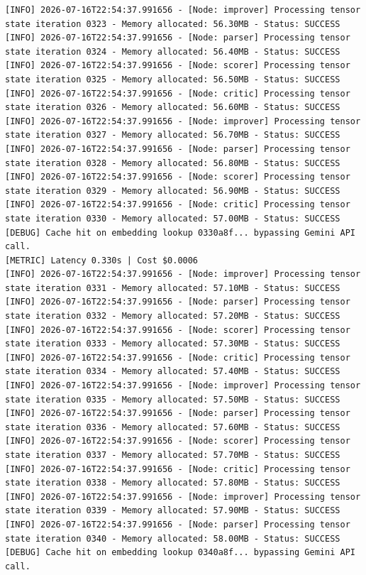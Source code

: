 \documentclass[10pt,journal,compsoc]{IEEEtran}
\begin{document}
\begin{verbatim}
[INFO] 2026-07-16T22:54:37.991656 - [Node: improver] Processing tensor state iteration 0323 - Memory allocated: 56.30MB - Status: SUCCESS
[INFO] 2026-07-16T22:54:37.991656 - [Node: parser] Processing tensor state iteration 0324 - Memory allocated: 56.40MB - Status: SUCCESS
[INFO] 2026-07-16T22:54:37.991656 - [Node: scorer] Processing tensor state iteration 0325 - Memory allocated: 56.50MB - Status: SUCCESS
[INFO] 2026-07-16T22:54:37.991656 - [Node: critic] Processing tensor state iteration 0326 - Memory allocated: 56.60MB - Status: SUCCESS
[INFO] 2026-07-16T22:54:37.991656 - [Node: improver] Processing tensor state iteration 0327 - Memory allocated: 56.70MB - Status: SUCCESS
[INFO] 2026-07-16T22:54:37.991656 - [Node: parser] Processing tensor state iteration 0328 - Memory allocated: 56.80MB - Status: SUCCESS
[INFO] 2026-07-16T22:54:37.991656 - [Node: scorer] Processing tensor state iteration 0329 - Memory allocated: 56.90MB - Status: SUCCESS
[INFO] 2026-07-16T22:54:37.991656 - [Node: critic] Processing tensor state iteration 0330 - Memory allocated: 57.00MB - Status: SUCCESS
[DEBUG] Cache hit on embedding lookup 0330a8f... bypassing Gemini API call.
[METRIC] Latency 0.330s | Cost $0.0006
[INFO] 2026-07-16T22:54:37.991656 - [Node: improver] Processing tensor state iteration 0331 - Memory allocated: 57.10MB - Status: SUCCESS
[INFO] 2026-07-16T22:54:37.991656 - [Node: parser] Processing tensor state iteration 0332 - Memory allocated: 57.20MB - Status: SUCCESS
[INFO] 2026-07-16T22:54:37.991656 - [Node: scorer] Processing tensor state iteration 0333 - Memory allocated: 57.30MB - Status: SUCCESS
[INFO] 2026-07-16T22:54:37.991656 - [Node: critic] Processing tensor state iteration 0334 - Memory allocated: 57.40MB - Status: SUCCESS
[INFO] 2026-07-16T22:54:37.991656 - [Node: improver] Processing tensor state iteration 0335 - Memory allocated: 57.50MB - Status: SUCCESS
[INFO] 2026-07-16T22:54:37.991656 - [Node: parser] Processing tensor state iteration 0336 - Memory allocated: 57.60MB - Status: SUCCESS
[INFO] 2026-07-16T22:54:37.991656 - [Node: scorer] Processing tensor state iteration 0337 - Memory allocated: 57.70MB - Status: SUCCESS
[INFO] 2026-07-16T22:54:37.991656 - [Node: critic] Processing tensor state iteration 0338 - Memory allocated: 57.80MB - Status: SUCCESS
[INFO] 2026-07-16T22:54:37.991656 - [Node: improver] Processing tensor state iteration 0339 - Memory allocated: 57.90MB - Status: SUCCESS
[INFO] 2026-07-16T22:54:37.991656 - [Node: parser] Processing tensor state iteration 0340 - Memory allocated: 58.00MB - Status: SUCCESS
[DEBUG] Cache hit on embedding lookup 0340a8f... bypassing Gemini API call.

\end{verbatim}
\end{document}
